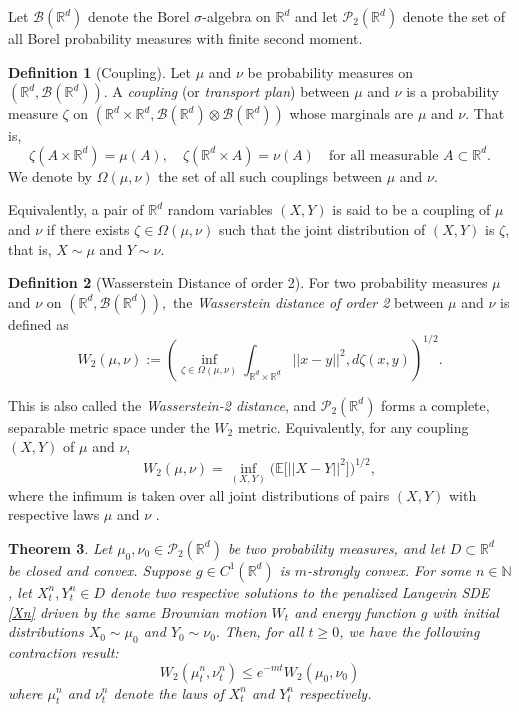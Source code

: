 \documentclass[amsfonts, reqno]{amsart}
\newtheorem{thm}{Theorem}[section]
\theoremstyle{definition}
\newtheorem{defn}[thm]{Definition}
\theoremstyle{remark}
\newcommand{\bbR}{\mathbb{R}}
\newcommand{\bbN}{\mathbb{N}}
\numberwithin{equation}{section}
\begin{document}
Let $\mathcal{B}(\bbR^d)$ denote the Borel $\sigma$-algebra on $\bbR^d$ and let $\mathcal{P}_2(\bbR^d)$ denote the set of all Borel probability measures with finite second moment. 
\begin{defn}[Coupling]
Let $\mu$ and $\nu$ be probability measures on $(\bbR^d, \mathcal{B}(\bbR^d)).$ A \textit{coupling} (or \textit{transport plan}) between $\mu$ and $\nu$ is a probability measure $\zeta$ on $(\bbR^d \times \bbR^d, \mathcal{B}(\bbR^d) \otimes \mathcal{B}(\bbR^d))$ whose marginals are $\mu$ and $\nu$. That is, \[
\zeta(A \times \bbR^d) = \mu(A), \quad \zeta(\bbR^d \times A) = \nu(A) \quad \text{for all measurable }A \subset \bbR^d.
\]  We denote by $\Omega(\mu, \nu)$ the set of all such couplings between $\mu$ and $\nu.$  
\end{defn}

Equivalently, a pair of $\bbR^d$ random variables $(X,Y)$ is said to be a coupling of $\mu$ and $\nu$ if there exists $\zeta \in \Omega(\mu, \nu)$ such that the joint distribution of $(X,Y)$ is $\zeta$, that is, $X \sim \mu$ and $Y \sim \nu.$

\begin{defn}[Wasserstein Distance of order 2] For two probability measures $\mu$ and $\nu$ on $(\bbR^d, \mathcal{B}(\bbR^d)),$ the \textit{Wasserstein distance of order 2} between $\mu$ and $\nu$ is defined as \begin{equation}\label{eq:W2}
W_2(\mu,\nu)
:= \left( \inf_{\zeta \in \Omega(\mu,\nu)}
\int_{\mathbb{R}^d \times \mathbb{R}^d} ||x-y||^2 , d\zeta(x,y) \right)^{1/2}.
\end{equation}
    
\end{defn}

This is also called the \textit{Wasserstein-2 distance}, and $\mathcal{P}_2(\bbR^d)$ forms a complete, separable metric space under the $W_2$ metric. Equivalently, for any coupling $(X,Y)$ of $\mu$ and $\nu$,
\begin{equation}\label{eq:W2_expectation}
W_2(\mu,\nu)
= \inf_{(X,Y)} \big( \mathbb{E}\big[||X-Y||^2\big] \big)^{1/2},
\end{equation} where the infimum is taken over all joint distributions of pairs $(X,Y)$ with respective laws $\mu$ and $\nu$ \cite{Villani2009}.

\begin{thm} \label{penalized contraction}
    Let $\mu_0, \nu_0 \in \mathcal{P}_2(\bbR^d)$ be two probability measures, and let $D \subset \bbR^d$ be closed and convex. Suppose $g \in C^1(\bbR^d)$ is $m$-strongly convex. For some $n \in \bbN$, let $X_t^n, Y_t^n \in D$ denote two respective solutions to the penalized Langevin SDE \eqref{Xn} driven by the same Brownian motion $W_t$ and energy function $g$ with initial distributions $X_0 \sim \mu_0$ and $Y_0 \sim \nu_0.$ Then, for all $t \geq 0$, we have the following contraction result: \begin{equation}
        W_2(\mu_t^n, \nu_t^n) \leq e^{-mt}W_2(\mu_0, \nu_0)
    \end{equation} where $\mu_t^n$ and $\nu_t^n$ denote the laws of $X_t^n$ and $Y_t^n$ respectively.
\end{thm}
\end{document}
